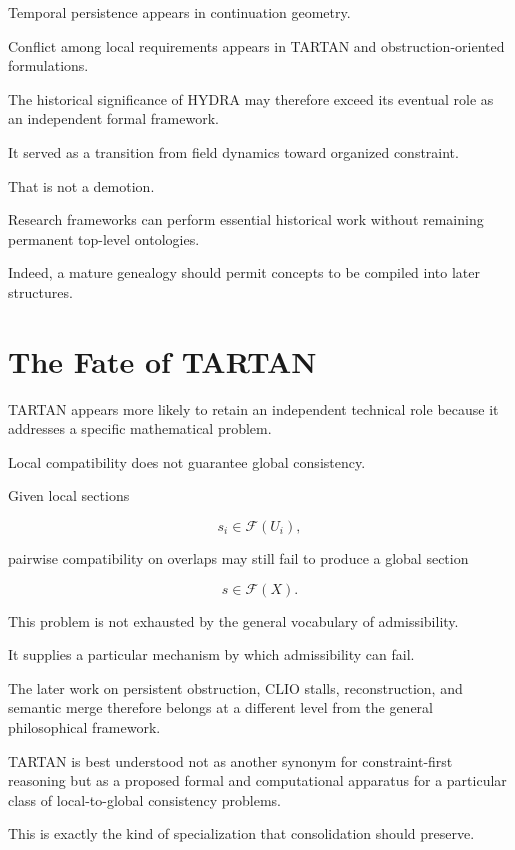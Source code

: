 \documentclass[11pt]{article}
\theoremstyle{remark}
\newcommand{\HYDRA}{\textsc{HYDRA}}
\newcommand{\TARTAN}{\textsc{TARTAN}}
\begin{document}
Temporal persistence appears in continuation geometry.

Conflict among local requirements appears in \TARTAN{} and obstruction-oriented formulations.

The historical significance of \HYDRA{} may therefore exceed its eventual role as an independent formal framework.

It served as a transition from field dynamics toward organized constraint.

That is not a demotion.

Research frameworks can perform essential historical work without remaining permanent top-level ontologies.

Indeed, a mature genealogy should permit concepts to be compiled into later structures.

\section{The Fate of TARTAN}

\TARTAN{} appears more likely to retain an independent technical role because it addresses a specific mathematical problem.

Local compatibility does not guarantee global consistency.

Given local sections

\begin{equation}
s_i\in\mathcal{F}(U_i),
\end{equation}

pairwise compatibility on overlaps may still fail to produce a global section

\begin{equation}
s\in\mathcal{F}(X).
\end{equation}

This problem is not exhausted by the general vocabulary of admissibility.

It supplies a particular mechanism by which admissibility can fail.

The later work on persistent obstruction, CLIO stalls, reconstruction, and semantic merge therefore belongs at a different level from the general philosophical framework.

\TARTAN{} is best understood not as another synonym for constraint-first reasoning but as a proposed formal and computational apparatus for a particular class of local-to-global consistency problems.

This is exactly the kind of specialization that consolidation should preserve.
\end{document}
